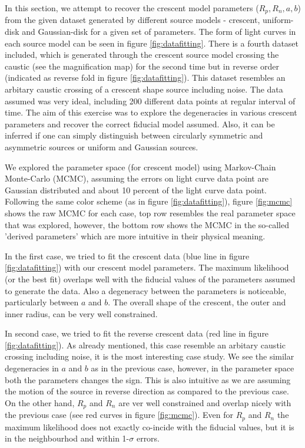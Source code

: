 In this section, we attempt to recover the crescent model parameters ($R_p, R_n, a, b$) from the given dataset generated by different source models - crescent, uniform-disk and Gaussian-disk for a given set of parameters. The form of light curves in each source model can be seen in figure \ref{fig:datafitting}. There is a fourth dataset included, which is generated through the crescent source model crossing the caustic (see the magnification map) for the second time but in reverse order (indicated as reverse fold in figure \ref{fig:datafitting}). This dataset resembles an arbitary caustic crossing of a crescent shape source including noise.  The data assumed was very  ideal, including 200 different data points at regular interval of time. The aim of this exercise was to explore the degeneracies in  various crescent parameters and recover the correct fiducial model assumed. Also, it can be inferred if one can simply distinguish between circularly symmetric and asymmetric sources or uniform and Gaussian sources.


We explored the parameter space (for crescent model) using Markov-Chain Monte-Carlo (MCMC), assuming the errors on light curve data point are Gaussian distributed and about 10 percent of the light curve data point. Following the same color scheme (as in figure \ref{fig:datafitting}), figure \ref{fig:mcmc} shows the raw MCMC for each case, top row resembles the real parameter space that was explored, however, the bottom row shows the MCMC in the so-called 'derived parameters' which are more intuitive in their physical meaning.

In the first case, we tried to fit the crescent data (blue line in figure \ref{fig:datafitting}) with our crescent model parameters. The maximum likelihood (or the best fit) overlaps well with the fiducial values of the parameters assumed to generate the data. Also a degeneracy between the parameters is noticeable, particularly between $a$ and $b$. The overall shape of the crescent, the outer and inner radius, can be very well constrained.

In second case, we tried to fit the reverse crescent data (red line in figure \ref{fig:datafitting}). As already mentioned, this case resemble an arbitary caustic crossing including noise, it is the most interesting case study. We see the similar degeneracies in $a$ and $b$ as in the previous case, however, in the parameter space both the parameters changes the sign. This is also intuitive as we are assuming the motion of the source in reverse direction as compared to the previous case. On the other hand, $R_p$ and $R_n$ are ver well constrained and overlap nicely with the previous case (see red curves in figure \ref{fig:mcmc}). Even for $R_p$ and $R_n$ the maximum likelihood does not exactly co-incide with the fiducial values, but it is in the neighbourhod and  within 1-$\sigma$ errors.

